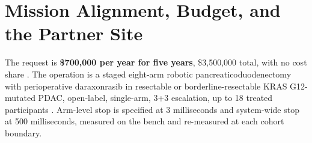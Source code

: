 \section{Mission Alignment, Budget, and the Partner Site}

The request is \textbf{\$700,000 per year for five years}, \$3,500,000 total,
with no cost share \cite{fundapp2}. The operation is a staged eight-arm robotic
pancreaticoduodenectomy with perioperative daraxonrasib in resectable or
borderline-resectable KRAS G12-mutated PDAC, open-label, single-arm, 3+3
escalation, up to 18 treated participants \cite{onpremwhippl,phase1ind}.
Arm-level stop is specified at 3 milliseconds and system-wide stop at 500
milliseconds, measured on the bench and re-measured at each cohort boundary.

